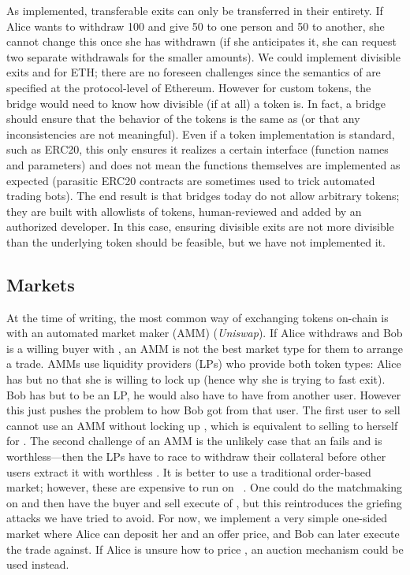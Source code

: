 As implemented, transferable exits can only be transferred in their entirety. If Alice wants to withdraw 100 \ethtwo and give 50 \ethxx to one person and 50 \ethxx to another, she cannot change this once she has withdrawn (if she anticipates it, she can request two separate withdrawals for the smaller amounts). We could implement divisible exits and for ETH; there are no foreseen challenges since the semantics of \ethone are specified at the protocol-level of Ethereum. However for custom tokens, the bridge would need to know how divisible (if at all) a token is. In fact, a bridge should ensure that the \layertwo  behavior of the tokens is the same as \layerone (or that any inconsistencies are not meaningful). Even if a token implementation is standard, such as ERC20, this only ensures it realizes a certain interface (function names and parameters) and does not mean the functions themselves are implemented as expected (parasitic ERC20 contracts are sometimes used to trick automated trading bots\textblue{~\cite{}}). The end result is that bridges today do not allow arbitrary tokens; they are built with allowlists of tokens, human-reviewed and added by an authorized developer. In this case, ensuring divisible exits are not more divisible than the underlying token should be feasible, but we have not implemented it.

\subsection{Markets}
\label{sec:uniswap}

At the time of writing, the most common way of exchanging tokens on-chain is with an automated market maker (AMM) (\eg \textit{Uniswap}). If Alice withdraws \ethxx and Bob is a willing buyer with \ethone, an AMM is not the best market type for them to arrange a trade. AMMs use liquidity providers (LPs) who provide both token types: Alice has \ethxx but no \ethone that she is willing to lock up (hence why she is trying to fast exit). Bob has \ethone but to be an LP, he would also have to have \ethxx from another user. However this just pushes the problem to how Bob got \ethxx from that user. The first user to sell \ethxx cannot use an AMM without locking up \ethone, which is equivalent to selling \ethxx to herself for \ethone. The second challenge of an AMM is the unlikely case that an \rblock fails and \ethxx is worthless---then the LPs have to race to withdraw their collateral before other users extract it with worthless \ethxx. It is better to use a traditional order-based market; however, these are expensive to run on \layerone~\cite{moosavi2021lissy}. One could do the matchmaking on \layertwo and then have the buyer and sell execute of \layerone, but this reintroduces the griefing attacks we have tried to avoid. For now, we implement a very simple one-sided market where Alice can deposit her \ethxx and an offer price, and Bob can later execute the trade against. If Alice is unsure how to price \ethxx, an auction mechanism could be used instead. 

